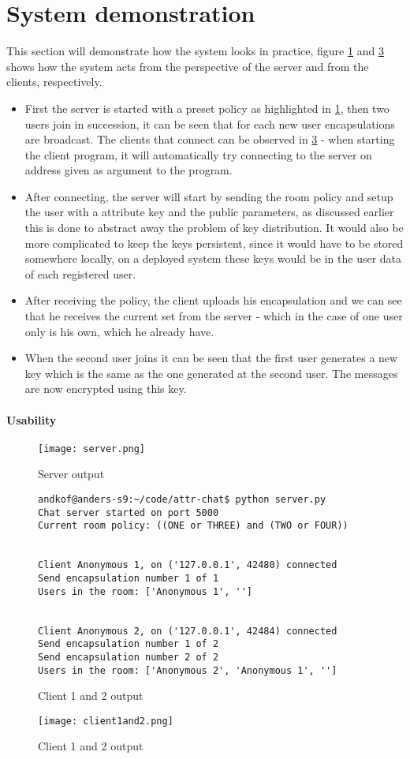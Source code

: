 \section{System demonstration}
This section will demonstrate how the system looks in practice, figure \ref{fig:server-output} and \ref{fig:client12-output} shows how the system acts from the perspective of the server and from the clients, respectively. 
\begin{itemize}
\item First the server is started with a preset policy as highlighted in \ref{fig:server-output}, then two users join in succession, it can be seen that for each new user encapsulations are broadcast. The clients that connect can be observed in \ref{fig:client12-output} - when starting the client program, it will automatically try connecting to the server on address given as argument to the program. 
\item After connecting, the server will start by sending the room policy and setup the user with a attribute key and the public parameters, as discussed earlier this is done to abstract away the problem of key distribution. It would also be more complicated to keep the keys persistent, since it would have to be stored somewhere locally, on a deployed system these keys would be in the user data of each registered user. 
\item After receiving the policy, the client uploads his encapsulation and we can see that he receives the current set from the server - which in the case of one user only is his own, which he already have. 
\item When the second user joins it can be seen that the first user generates a new key which is the same as the one generated at the second user. The messages are now encrypted using this key.
\end{itemize}

\paragraph{Usability}


\begin{figure}
\centering
\texttt{[image: server.png]}
\caption{Server output}
\label{fig:server-output}
\end{figure}


\begin{figure}
\centering
\begin{lstlisting}
andkof@anders-s9:~/code/attr-chat$ python server.py 
Chat server started on port 5000
Current room policy: ((ONE or THREE) and (TWO or FOUR))


Client Anonymous 1, on ('127.0.0.1', 42480) connected
Send encapsulation number 1 of 1
Users in the room: ['Anonymous 1', '']


Client Anonymous 2, on ('127.0.0.1', 42484) connected
Send encapsulation number 1 of 2
Send encapsulation number 2 of 2
Users in the room: ['Anonymous 2', 'Anonymous 1', '']

\end{lstlisting}
\caption{Client 1 and 2 output}
\label{fig:client12-output2}
\end{figure}



\begin{figure}
\centering
\texttt{[image: client1and2.png]}
\caption{Client 1 and 2 output}
\label{fig:client12-output}
\end{figure}

